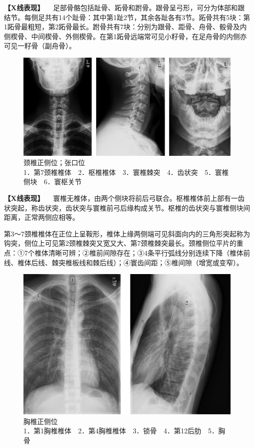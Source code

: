 \textbf{【X线表现】}
　足部骨骼包括趾骨、跖骨和跗骨。跟骨呈弓形，可分为体部和跟结节。每侧足共有14个趾骨：其中第1趾2节，其余各趾各有3节。跖骨共有5块：第1跖骨最粗短，第2跖骨最长。跗骨共有7块：分别为跟骨、距骨、舟骨、骰骨及内侧楔骨、中间楔骨、外侧楔骨。在第1跖骨远端常可见小籽骨，在足舟骨的内侧亦可见一籽骨（副舟骨）。

\begin{figure}[!htbp]
 \centering
 \includegraphics{./images/Image00011.jpg}
 \captionsetup{justification=centering}
 \caption{颈椎正侧位；张口位\\{\small 1．第7颈椎椎体　2．枢椎椎体　3．寰椎棘突　4．齿状突　5．寰椎侧块　6．寰枢关节}}
 \label{fig2-1-9}
  \end{figure} 

\textbf{【X线表现】}
　寰椎无椎体，由两个侧块将前后弓联合。枢椎椎体前上部有一齿状突起，称齿状突，齿状突与寰椎前弓后缘构成关节。枢椎的齿状突与寰椎侧块间距离，正常两侧应相等。

第3～7颈椎椎体在正位上呈鞍形，椎体上缘两侧端可见斜面向内的三角形突起称为钩突，侧位上可见第2颈椎棘突又宽又大、第7颈椎棘突最长。颈椎侧位平片的重点：①7个椎体清晰可辨；②椎前间隙存在；③4条平行弧线分别连续下降（椎体前线、椎体后线、棘突椎板线和棘后线）；④寰齿间距；⑤椎间隙（增宽或变窄）。

\begin{figure}[!htbp]
 \centering
 \includegraphics{./images/Image00012.jpg}
 \captionsetup{justification=centering}
 \caption{胸椎正侧位\\{\small 1．第1胸椎椎体　2．第4胸椎椎体　3．锁骨　4．第12后肋　5．胸骨}}
 \label{fig2-1-10}
  \end{figure} 

